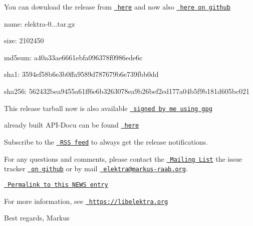 You can download the release from \href{https://www.libelektra.org/ftp/elektra/releases/elektra-0.8.12.tar.gz}{\texttt{ here}} and now also \href{https://github.com/ElektraInitiative/ftp/tree/master/releases/elektra-0.8.12.tar.gz}{\texttt{ here on github}}


\begin{DoxyItemize}
\item name\+: elektra-\/0...\+tar.\+gz
\item size\+: 2102450
\item md5sum\+: a40a33ae6661ebfa096378f0986ede6c
\item sha1\+: 3594ef58b6e3b0ffa9589d787679b6e739fbb0dd
\item sha256\+: 562432bea9455a61ff6e6b3263078ea9b26bef2ed177a04b5f9b181d605bc021
\end{DoxyItemize}

This release tarball now is also available \href{https://www.libelektra.org/ftp/elektra/releases/elektra-0.8.12.tar.gz.gpg}{\texttt{ signed by me using gpg}}

already built A\+P\+I-\/\+Docu can be found \href{https://doc.libelektra.org/api/0.8.12/html/}{\texttt{ here}}

Subscribe to the \href{https://doc.libelektra.org/news/feed.rss}{\texttt{ R\+SS feed}} to always get the release notifications.

For any questions and comments, please contact the \href{https://lists.sourceforge.net/lists/listinfo/registry-list}{\texttt{ Mailing List}} the issue tracker \href{https://git.libelektra.org/issues}{\texttt{ on github}} or by mail \href{mailto:elektra@markus-raab.org}{\texttt{ elektra@markus-\/raab.\+org}}.

\href{https://doc.libelektra.org/news/98770541-32a1-486a-98a1-d02f26afc81a.html}{\texttt{ Permalink to this N\+E\+WS entry}}

For more information, see \href{https://libelektra.org}{\texttt{ https\+://libelektra.\+org}}

Best regards, Markus 